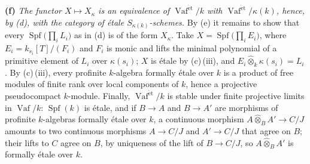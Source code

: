 \smallskip
\noindent\textbf{(f)}
\emph{The functor \(X\mapsto X_\kappa\) is an equivalence of
\(\operatorname{Vaf}^{\mathrm{\acute{e}t}}/k\) with
\(\operatorname{Vaf}^{\mathrm{\acute{e}t}}/\kappa(k)\), hence, by
\textup{(d)}, with the category of étale \(S_{\kappa(k)}\)-schemes.}
By \textup{(e)} it remains to show that every
\(\operatorname{Spf}\bigl(\prod_iL_i\bigr)\) as in \textup{(d)} is of the
form \(X_\kappa\). Take \(X=\operatorname{Spf}\bigl(\prod_iE_i\bigr)\),
where \(E_i=k_{s_i}[T]/(F_i)\) and \(F_i\) is monic and lifts the
minimal polynomial of a primitive element of \(L_i\) over
\(\kappa(s_i)\); \(X\) is étale by \textup{(c)}\,\textup{(iii)}, and
\(E_i\widehat\otimes_k\kappa(s_i)=L_i\). By \textup{(c)}\,\textup{(iii)},
every profinite \(k\)-algebra formally étale over \(k\) is a product of
free modules of finite rank over local components of \(k\), hence a
projective pseudocompact \(k\)-module. Finally,
\(\operatorname{Vaf}^{\mathrm{\acute{e}t}}/k\) is stable under finite
projective limits in \(\operatorname{Vaf}/k\): \(\operatorname{Spf}(k)\)
is étale, and if \(B\to A\) and \(B\to A'\) are morphisms of profinite
\(k\)-algebras formally étale over \(k\), a continuous morphism
\(A\widehat\otimes_BA'\to C/J\) amounts to two continuous morphisms
\(A\to C/J\) and \(A'\to C/J\) that agree on \(B\); their lifts to
\(C\) agree on \(B\), by uniqueness of the lift of \(B\to C/J\), so
\(A\widehat\otimes_BA'\) is formally étale over \(k\).
